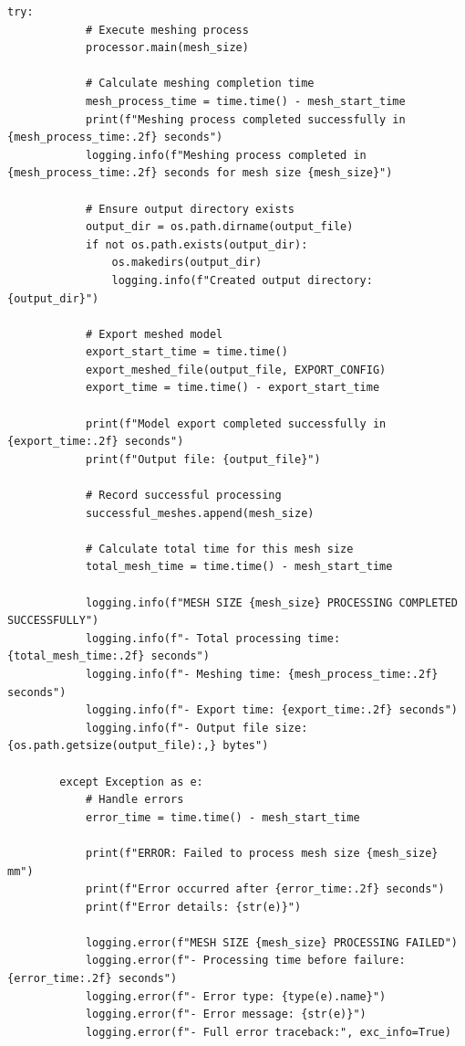 \documentclass{book}
\begin{document}
\begin{itemize}[leftmargin=*,label=\textbullet]
\begin{itemize}
\begin{lstlisting}[caption={Phase 1 Meshing Automation Script},label={lst:phase1}]
        try:
            # Execute meshing process
            processor.main(mesh_size)
            
            # Calculate meshing completion time
            mesh_process_time = time.time() - mesh_start_time
            print(f"Meshing process completed successfully in {mesh_process_time:.2f} seconds")
            logging.info(f"Meshing process completed in {mesh_process_time:.2f} seconds for mesh size {mesh_size}")
            
            # Ensure output directory exists
            output_dir = os.path.dirname(output_file)
            if not os.path.exists(output_dir):
                os.makedirs(output_dir)
                logging.info(f"Created output directory: {output_dir}")
            
            # Export meshed model
            export_start_time = time.time()
            export_meshed_file(output_file, EXPORT_CONFIG)
            export_time = time.time() - export_start_time
            
            print(f"Model export completed successfully in {export_time:.2f} seconds")
            print(f"Output file: {output_file}")
            
            # Record successful processing
            successful_meshes.append(mesh_size)
            
            # Calculate total time for this mesh size
            total_mesh_time = time.time() - mesh_start_time
            
            logging.info(f"MESH SIZE {mesh_size} PROCESSING COMPLETED SUCCESSFULLY")
            logging.info(f"- Total processing time: {total_mesh_time:.2f} seconds")
            logging.info(f"- Meshing time: {mesh_process_time:.2f} seconds")
            logging.info(f"- Export time: {export_time:.2f} seconds")
            logging.info(f"- Output file size: {os.path.getsize(output_file):,} bytes")
            
        except Exception as e:
            # Handle errors
            error_time = time.time() - mesh_start_time
            
            print(f"ERROR: Failed to process mesh size {mesh_size} mm")
            print(f"Error occurred after {error_time:.2f} seconds")
            print(f"Error details: {str(e)}")
            
            logging.error(f"MESH SIZE {mesh_size} PROCESSING FAILED")
            logging.error(f"- Processing time before failure: {error_time:.2f} seconds")
            logging.error(f"- Error type: {type(e).name}")
            logging.error(f"- Error message: {str(e)}")
            logging.error(f"- Full error traceback:", exc_info=True)
            

\end{lstlisting}
\end{itemize}
\end{itemize}
\end{document}

